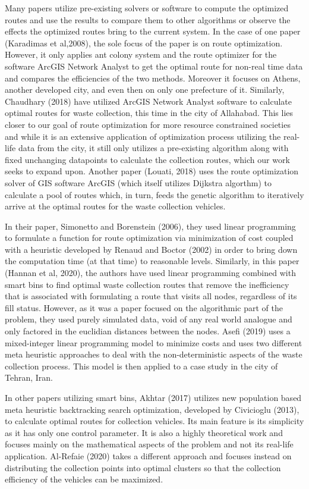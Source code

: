 \documentclass[12pt]{article}
\begin{document}
Many papers utilize pre-existing solvers or software to compute the optimized routes and use the results to compare them to other algorithms or observe the effects the optimized routes bring to the current system. In the case of one paper (Karadimas et al,2008), the sole focus of the paper is on route optimization. However, it only applies ant colony system and the route optimizer for the software ArcGIS Network Analyst to get the optimal route for non-real time data and compares the efficiencies of the two methods. Moreover it focuses on Athens, another developed city, and even then on only one prefecture of it. Similarly, Chaudhary (2018) have utilized ArcGIS Network Analyst software to calculate optimal routes for waste collection, this time in the city of Allahabad. This lies closer to our goal of route optimization for more resource constrained societies and while it is an extensive application of optimization process utilizing the real-life data from the city, it still only utilizes a pre-existing algorithm along with fixed unchanging datapoints to calculate the collection routes, which our work seeks to expand upon. Another paper (Louati, 2018) uses the route optimization solver of GIS software ArcGIS (which itself utilizes Dijkstra algorthm) to calculate a pool of routes which, in turn, feeds the genetic algorithm to iteratively arrive at the optimal routes for the waste collection vehicles.

In their paper, Simonetto and Borenstein (2006), they used linear programming to formulate a function for route optimization via minimization of cost coupled with a heuristic developed by Renaud and Boctor (2002) in order to bring down the computation time (at that time) to reasonable levels. Similarly, in this paper (Hannan et al, 2020), the authors have used linear programming combined with smart bins to find optimal waste collection routes that remove the inefficiency that is associated with formulating a route that visits all nodes, regardless of its fill status. However, as it was a paper focused on the algorithmic part of the problem, they used purely simulated data, void of any real world analogue and only factored in the euclidian distances between the nodes. Asefi (2019) uses a mixed-integer linear programming model to minimize costs and uses two different meta heuristic approaches to deal with the non-deterministic aspects of the waste collection process. This model is then applied to a case study in the city of Tehran, Iran. 

In other papers utilizing smart bins, Akhtar (2017) utilizes new population based meta heuristic backtracking search optimization, developed by Civicioglu (2013), to calculate optimal routes for collection vehicles. Its main feature is its simplicity as it has only one control parameter. It is also a highly theoretical work and focuses mainly on the mathematical aspects of the problem and not its real-life application. Al-Refaie (2020) takes a different approach and focuses instead on distributing the collection points into optimal clusters so that the collection efficiency of the vehicles can be maximized.
\end{document}
